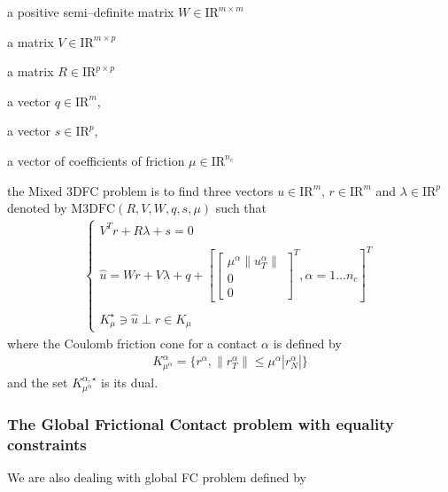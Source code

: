 \begin{DoxyItemize}
\item a positive semi--definite matrix ${W} \in {\mathrm{I\!R}}^{m \times m}$ 
\item a matrix ${V} \in {\mathrm{I\!R}}^{m \times p}$ 
\item a matrix ${R} \in {\mathrm{I\!R}}^{p \times p}$ 
\item a vector $q \in {\mathrm{I\!R}}^{m}$, 
\item a vector $s \in {\mathrm{I\!R}}^{p}$, 
\item a vector of coefficients of friction $\mu \in {\mathrm{I\!R}}^{n_c}$ 
\end{DoxyItemize}the Mixed 3\+D\+FC problem is to find three vectors $u\in{\mathrm{I\!R}}^m$, $r\in {\mathrm{I\!R}}^m$ and $\lambda \in {\mathrm{I\!R}}^p$ denoted by $\mathrm{M3DFC}(R,V,W,q,s,\mu)$ such that \begin{eqnarray*}\label{eq:lcp1} \begin{cases} V^T {r} + R \lambda + s = 0 \\ \\ \hat u = W {r} + V\lambda + q +\left[ \left[\begin{array}{c} \mu^\alpha \|u^\alpha_T\|\\ 0 \\ 0 \end{array}\right]^T, \alpha = 1 \ldots n_c \right]^T \\ \\ K^\star_{\mu} \ni {\hat u} \perp r \in K_{\mu} \end{cases} \end{eqnarray*} where the Coulomb friction cone for a contact $\alpha$ is defined by \begin{eqnarray*} \label{eq:CCC} K _{\mu^\alpha}^{\alpha} = \{r^\alpha, \|r^\alpha_T \| \leq \mu^\alpha |r^\alpha_N| \} \end{eqnarray*} and the set $K^{\alpha,\star}_{\mu^\alpha}$ is its dual. \hypertarget{index_globalfclib}{}\subsubsection{The Global Frictional Contact problem with equality constraints}\label{index_globalfclib}
We are also dealing with global FC problem defined by

